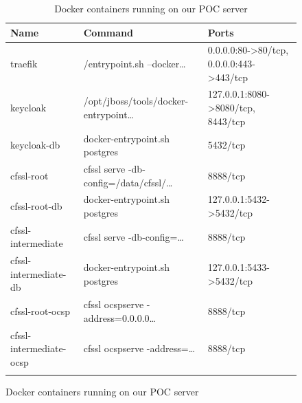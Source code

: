 \begin{figure}
    \begin{longtable}{p{3.4cm}p{5.7cm}p{6.2cm}}
        \hline
        \textbf{Name} & \textbf{Command} & \textbf{Ports} \\ \hline
        traefik & /entrypoint.sh --docker\ldots & 0.0.0.0:80->80/tcp, 0.0.0.0:443->443/tcp \\*
        keycloak & /opt/jboss/tools/docker-entrypoint\ldots & 127.0.0.1:8080->8080/tcp, 8443/tcp \\*
        keycloak-db & docker-entrypoint.sh postgres & 5432/tcp \\*
        cfssl-root & cfssl serve -db-config=/data/cfssl/\ldots & 8888/tcp \\*
        cfssl-root-db & docker-entrypoint.sh postgres & 127.0.0.1:5432->5432/tcp \\*
        cfssl-intermediate & cfssl serve -db-config=\ldots & 8888/tcp \\*
        cfssl-intermediate-db & docker-entrypoint.sh postgres & 127.0.0.1:5433->5432/tcp \\*
        cfssl-root-ocsp & cfssl ocspserve -address=0.0.0.0\ldots & 8888/tcp \\*
        cfssl-intermediate-ocsp & cfssl ocspserve -address=\ldots & 8888/tcp \\*
        \caption{Docker containers running on our POC server}\label{tbl:docker}
    \end{longtable}
\end{figure}
